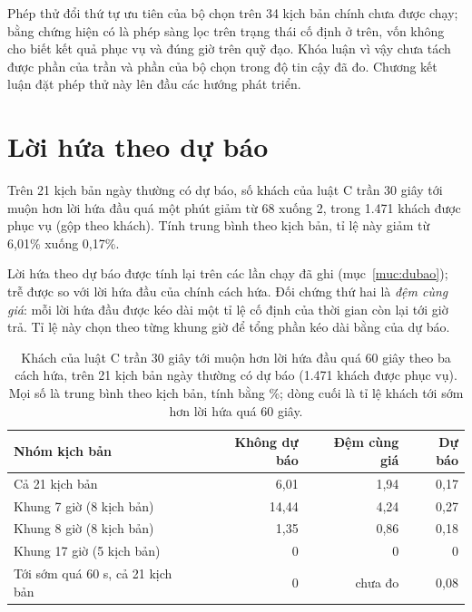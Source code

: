 Phép thử đổi thứ tự ưu tiên của bộ chọn trên 34 kịch bản chính chưa được chạy; bằng chứng hiện có là phép sàng lọc
trên trạng thái cố định ở trên, vốn không cho biết kết quả phục vụ và đúng giờ trên quỹ đạo. Khóa luận vì vậy chưa
tách được phần của trần và phần của bộ chọn trong độ tin cậy đã đo. Chương kết luận đặt phép thử này lên đầu các hướng
phát triển.

\section{Lời hứa theo dự báo}
\label{muc:c4-dubao}

Trên 21 kịch bản ngày thường có dự báo, số khách của luật C trần 30 giây tới muộn hơn lời hứa đầu quá một phút
giảm từ 68 xuống 2, trong 1.471 khách được phục vụ (gộp theo khách). Tính trung bình theo kịch bản, tỉ lệ này giảm
từ 6,01\% xuống 0,17\%.

Lời hứa theo dự báo được tính lại trên các lần chạy đã ghi (mục~\ref{muc:dubao}); trễ được so với lời hứa đầu của
chính cách hứa. Đối chứng thứ hai là \emph{đệm cùng giá}: mỗi lời hứa đầu được kéo dài một tỉ lệ cố định của thời
gian còn lại tới giờ trả. Tỉ lệ này chọn theo từng khung giờ để tổng phần kéo dài bằng của dự báo.

\begin{table}[htbp]
\centering
\caption{Khách của luật C trần 30 giây tới muộn hơn lời hứa đầu quá 60 giây theo ba cách hứa, trên 21 kịch bản
ngày thường có dự báo (1.471 khách được phục vụ). Mọi số là trung bình theo kịch bản, tính bằng \%; dòng cuối là
tỉ lệ khách tới sớm hơn lời hứa quá 60 giây.}
\label{bang:c4-dubao}
\small
\begin{tabular}{@{}lrrr@{}}
\toprule
\textbf{Nhóm kịch bản} & \textbf{Không dự báo} & \textbf{Đệm cùng giá} & \textbf{Dự báo}\\
\midrule
Cả 21 kịch bản & 6,01 & 1,94 & 0,17\\
Khung 7 giờ (8 kịch bản) & 14,44 & 4,24 & 0,27\\
Khung 8 giờ (8 kịch bản) & 1,35 & 0,86 & 0,18\\
Khung 17 giờ (5 kịch bản) & 0 & 0 & 0\\
\midrule
Tới sớm quá 60 s, cả 21 kịch bản & 0 & chưa đo & 0,08\\
\bottomrule
\end{tabular}
\end{table}

